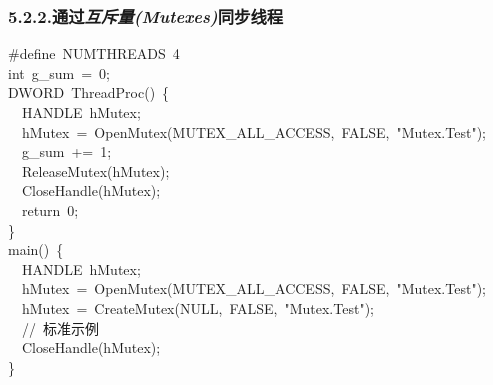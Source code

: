 \documentclass{article}
\begin{document}
\subsubsection{5.2.2.\hspace*{0.5em}通过\emph{互斥量(Mutexes)}同步线程}\label{sec--mutexes-}%
\begin{mdpre}%
\noindent\#define~{NUMTHREADS}~{4}\\
{int}~g\_sum~=~{0};\\
{DWORD}~{ThreadProc}()~\{\\
~~{HANDLE}~hMutex;\\
~~hMutex~=~{OpenMutex}({MUTEX\_ALL\_ACCESS},~{FALSE},~{"}{Mutex.Test}{"});\\
~~g\_sum~+=~{1};\\
~~{ReleaseMutex}(hMutex);\\
~~{CloseHandle}(hMutex);\\
~~{return}~{0};\\
\}\\
main()~\{\\
~~{HANDLE}~hMutex;\\
~~hMutex~=~{OpenMutex}({MUTEX\_ALL\_ACCESS},~{FALSE},~{"}{Mutex.Test}{"});\\
~~hMutex~=~{CreateMutex}({NULL},~{FALSE},~{"}{Mutex.Test}{"});\\
~~{//~标准示例}\\
~~{CloseHandle}(hMutex);\\
\}%
\end{mdpre}
\end{document}
